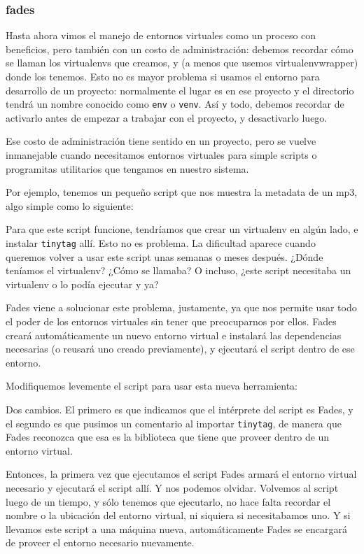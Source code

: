 \subsubsection{fades}\label{subsub:fades}

Hasta ahora vimos el manejo de entornos virtuales como un proceso con beneficios, pero también con un costo de administración: debemos recordar cómo se llaman los virtualenvs que creamos, y (a menos que usemos virtualenvwrapper) donde los tenemos. Esto no es mayor problema si usamos el entorno para desarrollo de un proyecto: normalmente el lugar es en ese proyecto y el directorio tendrá un nombre conocido como \texttt{env} o \texttt{venv}. Así y todo, debemos recordar de activarlo antes de empezar a trabajar con el proyecto, y desactivarlo luego.

Ese costo de administración tiene sentido en un proyecto, pero se vuelve inmanejable cuando necesitamos entornos virtuales para simple scripts o programitas utilitarios que tengamos en nuestro sistema.

Por ejemplo, tenemos un pequeño script que nos muestra la metadata de un mp3, algo simple como lo siguiente:


Para que este script funcione, tendríamos que crear un virtualenv en algún lado, e instalar \texttt{tinytag} allí. Esto no es problema. La dificultad aparece cuando queremos volver a usar este script unas semanas o meses después. ¿Dónde teníamos el virtualenv? ¿Cómo se llamaba? O incluso, ¿este script necesitaba un virtualenv o lo podía ejecutar y ya?

Fades viene a solucionar este problema, justamente, ya que nos permite usar todo el poder de los entornos virtuales sin tener que preocuparnos por ellos. Fades creará automáticamente un nuevo entorno virtual e instalará las dependencias necesarias (o reusará uno creado previamente), y ejecutará el script dentro de ese entorno.

Modifiquemos levemente el script para usar esta nueva herramienta:


Dos cambios. El primero es que indicamos que el intérprete del script es Fades, y el segundo es que pusimos un comentario al importar \texttt{tinytag}, de manera que Fades reconozca que esa es la biblioteca que tiene que proveer dentro de un entorno virtual.

Entonces, la primera vez que ejecutamos el script Fades armará el entorno virtual necesario y ejecutará el script allí. Y nos podemos olvidar. Volvemos al script luego de un tiempo, y sólo tenemos que ejecutarlo, no hace falta recordar el nombre o la ubicación del entorno virtual, ni siquiera si necesitabamos uno. Y si llevamos este script a una máquina nueva, automáticamente Fades se encargará de proveer el entorno necesario nuevamente.

